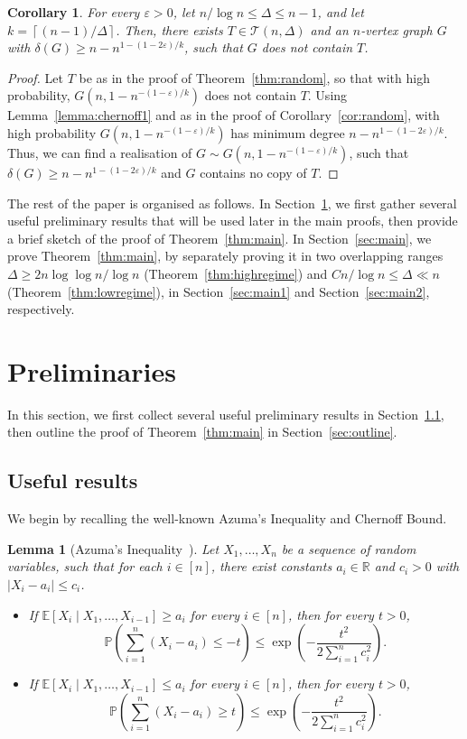 \documentclass{article}
\theoremstyle{plain}
\newtheorem{corollary}[theorem]{Corollary}
\newtheorem{lemma}[theorem]{Lemma}
\theoremstyle{definition}
\numberwithin{equation}{section}
\def\eps{\varepsilon}
\newcommand\ceil[1]{\left\lceil#1\right\rceil}
\newcommand\cT{\mathcal{T}}
\begin{document}
\begin{corollary}\label{cor:notcontain}
For every $\eps>0$, let $n/\log n\leq\Delta\leq n-1$, and let $k=\ceil{(n-1)/\Delta}$. Then, there exists $T\in\cT(n,\Delta)$ and an $n$-vertex graph $G$ with $\delta(G)\geq n-n^{1-(1-2\eps)/k}$, such that $G$ does not contain $T$.
\end{corollary}
\begin{proof}%
Let $T$ be as in the proof of Theorem~\ref{thm:random}, so that with high probability, $G(n,1-n^{-(1-\eps)/k})$ does not contain $T$. Using Lemma~\ref{lemma:chernoff1} and as in the proof of Corollary~\ref{cor:random}, with high probability $G(n,1-n^{-(1-\eps)/k})$ has minimum degree $n-n^{1-(1-2\eps)/k}$. Thus, we can find a realisation of $G\sim G(n,1-n^{-(1-\eps)/k})$, such that $\delta(G)\geq n-n^{1-(1-2\eps)/k}$ and $G$ contains no copy of $T$. 
\end{proof}

The rest of the paper is organised as follows. In Section~\ref{sec:prelim}, we first gather several useful preliminary results that will be used later in the main proofs, then provide a brief sketch of the proof of Theorem~\ref{thm:main}. In Section~\ref{sec:main}, we prove Theorem~\ref{thm:main}, by separately proving it in two overlapping ranges $\Delta\geq2n\log\log n/\log n$ (Theorem~\ref{thm:highregime}) and  $Cn/\log n\leq\Delta\ll n$ (Theorem~\ref{thm:lowregime}), in Section~\ref{sec:main1} and Section~\ref{sec:main2}, respectively.

\section{Preliminaries}\label{sec:prelim}
In this section, we first collect several useful preliminary results in Section~\ref{sec:useful}, then outline the proof of Theorem~\ref{thm:main} in Section~\ref{sec:outline}. 
\subsection{Useful results}\label{sec:useful}
We begin by recalling the well-known Azuma's Inequality and Chernoff Bound.
\begin{lemma}[Azuma's Inequality~{\cite[Lemma 4.2]{W}}]\label{lemma:azuma}
Let $X_1,\ldots, X_n$ be a sequence of random variables, such that for each $i\in[n]$, there exist constants $a_i\in\mathbb{R}$ and $c_i>0$ with $|X_i-a_i|\leq c_i$.
\begin{itemize}
    \item If $\mathbb{E}[X_i\mid X_1,\ldots,X_{i-1}]\geq a_i$ for every $i\in[n]$, then for every $t>0$, \[\textstyle\mathbb{P}\left(\sum_{i=1}^n(X_i-a_i)\leq-t\right)\leq\exp\left(-\frac{t^2}{2\sum_{i=1}^nc_i^2}\right).\]
    \item If $\mathbb{E}[X_i\mid X_1,\ldots,X_{i-1}]\leq a_i$ for every $i\in[n]$, then for every $t>0$, \[\textstyle \mathbb{P}\left(\sum_{i=1}^n(X_i-a_i)\geq t\right)\leq\exp\left(-\frac{t^2}{2\sum_{i=1}^nc_i^2}\right).\]
\end{itemize}
\end{lemma}
\end{document}

